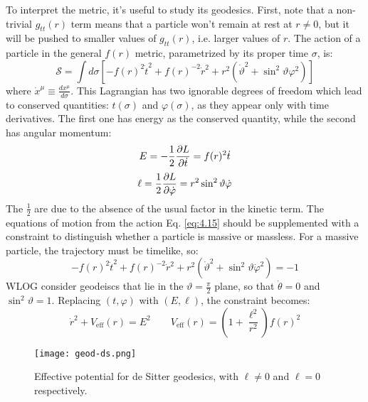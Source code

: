 To interpret the metric, it's useful to study its geodesics. First, note that a non-trivial $ g_{tt}(r) $ term means that a particle won't remain at rest at $ r \neq 0 $, but it will be pushed to smaller values of $ g_{tt}(r) $, i.e. larger values of $ r $. The action of a particle in the general $ f(r) $ metric, parametrized by its proper time $ \sigma $, is:
\begin{equation}
  \mathcal{S} = \int d\sigma \left[ - f(r)^2 \dot{t}^2 + f(r)^{-2} \dot{r}^2 + r^2 (\dot{\vartheta}^2 + \sin^2 \vartheta \varphi^2) \right]
  \label{eq:4.15}
\end{equation}
where $ \dot{x}^\mu \equiv \frac{dx^\mu}{d\sigma} $. This Lagrangian has two ignorable degrees of freedom which lead to conserved quantities: $ t(\sigma) $ and $ \varphi(\sigma) $, as they appear only with time derivatives. The first one has energy as the conserved quantity, while the second has angular momentum:
\begin{equation}
  E = - \frac{1}{2} \frac{\partial L}{\partial \dot{t}} = f(r)^2 \dot{t}
  \label{eq:4.16}
\end{equation}
\begin{equation}
  \ell = \frac{1}{2} \frac{\partial L}{\partial \dot{\varphi}} = r^2 \sin^2 \vartheta \dot{\varphi}
  \label{eq:4.17}
\end{equation}
The $ \frac{1}{2} $ are due to the absence of the usual factor in the kinetic term. The equations of motion from the action Eq. \ref{eq:4.15} should be supplemented with a constraint to distinguish whether a particle is massive or massless. For a massive particle, the trajectory must be timelike, so:
\begin{equation*}
  - f(r)^2 \dot{t}^2 + f(r)^{-2} \dot{r}^2 + r^2 (\dot{\vartheta}^2 + \sin^2 \vartheta \dot{\varphi}^2) = -1
\end{equation*}
WLOG consider geodeiscs that lie in the $ \vartheta = \frac{\pi}{2} $ plane, so that $ \dot{\theta} = 0 $ and $ \sin^2 \vartheta = 1 $. Replacing $ (t,\varphi) $ with $ (E,\ell) $, the constraint becomes:
\begin{equation}
  \dot{r}^2 + V_{\text{eff}}(r) = E^2
  \qquad
  V_{\text{eff}}(r) = \left( 1 + \frac{\ell^2}{r^2} \right) f(r)^2
  \label{eq:4.18}
\end{equation}

\begin{figure}
  \centering
  \texttt{[image: geod-ds.png]}
  \caption{Effective potential for de Sitter geodesics, with $ \ell \neq 0 $ and $ \ell = 0 $ respectively.}
  \label{geo-ds}
\end{figure}

